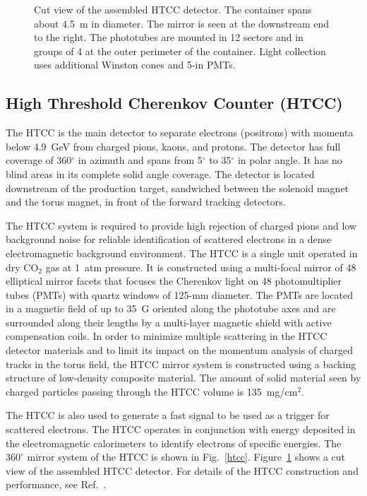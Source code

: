 \documentclass[final,3p,twocolumn]{elsarticle}
\begin{document}
\begin{figure}[htbp!]
\caption{Cut view of the assembled HTCC detector. The container spans about 4.5~m in diameter. The mirror is
seen at the downstream end to the right. The phototubes are mounted in 12 sectors and in groups of 4 at the outer
perimeter of the container. Light collection uses additional Winston cones and 5-in PMTs.}
\label{HTCC-container}
\end{figure}

\subsection{High Threshold Cherenkov Counter (HTCC)}

The HTCC is the main detector to separate electrons (positrons) with momenta below 4.9~GeV from charged pions,
kaons, and protons. The detector has full coverage of 360$^\circ$ in azimuth and spans from 5$^\circ$ to 35$^\circ$
in polar angle. It has no blind areas in its complete solid angle coverage. The detector is located downstream of the
production target, sandwiched between the solenoid magnet and the torus magnet, in front of the forward tracking
detectors. 

The HTCC system is required to provide high rejection of charged pions and low background noise for reliable 
identification of scattered electrons in a dense electromagnetic background environment. The HTCC is a single unit
operated in dry CO$_2$ gas at 1~atm pressure. It is constructed using a multi-focal mirror of 48 elliptical mirror
facets that focuses the Cherenkov light on 48 photomultiplier tubes (PMTs) with quartz windows of 125-mm diameter.
The PMTs are located in a magnetic field of up to 35~G oriented along the phototube axes and are surrounded along
their lengths by a multi-layer magnetic shield with active compensation coils. In order to minimize multiple scattering
in the HTCC detector materials and to limit its impact on the momentum analysis of charged tracks in the torus field,
the HTCC mirror system is constructed using a backing structure of low-density composite material. The amount of
solid material seen by charged particles passing through the HTCC volume is 135~mg/cm$^2$. 

The HTCC is also used to generate a fast signal to be used as a trigger for scattered electrons. The HTCC operates
in conjunction with energy deposited in the electromagnetic calorimeters to identify electrons of specific energies.
The $360^\circ$ mirror system of the HTCC is shown in Fig.~\ref{htcc}. Figure~\ref{HTCC-container} shows a cut
view of the assembled HTCC detector. For details of the HTCC construction and performance, see Ref.~\cite{HTCC}.   
\end{document}
